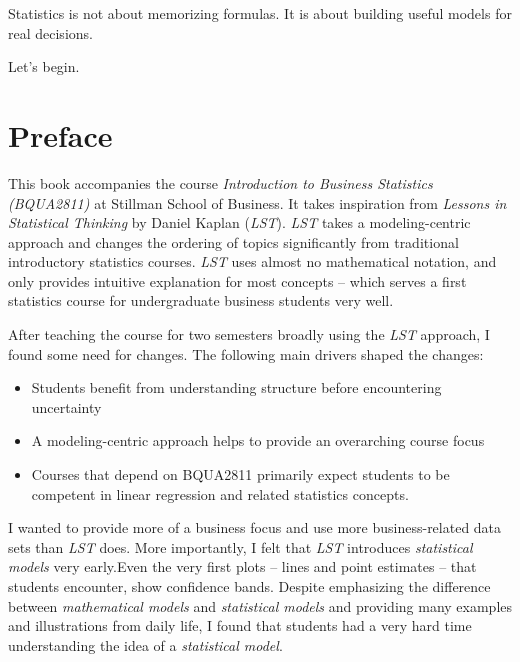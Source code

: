 \documentclass[
  12pt,
  letterpaper,
  DIV=11,
  numbers=noendperiod]{scrreprt}
\providecommand{\tightlist}{%
  \setlength{\itemsep}{0pt}\setlength{\parskip}{0pt}}
\begin{document}
Statistics is not about memorizing formulas. It is about building useful
models for real decisions.

Let's begin.


\chapter*{Preface}\label{preface}


This book accompanies the course \emph{Introduction to Business
Statistics (BQUA2811)} at Stillman School of Business. It takes
inspiration from \emph{Lessons in Statistical Thinking} by Daniel Kaplan
(\emph{LST}). \emph{LST} takes a modeling-centric approach and changes
the ordering of topics significantly from traditional introductory
statistics courses. \emph{LST} uses almost no mathematical notation, and
only provides intuitive explanation for most concepts -- which serves a
first statistics course for undergraduate business students very well.

After teaching the course for two semesters broadly using the \emph{LST}
approach, I found some need for changes. The following main drivers
shaped the changes:

\begin{itemize}
\tightlist
\item
  Students benefit from understanding structure before encountering
  uncertainty
\item
  A modeling-centric approach helps to provide an overarching course
  focus
\item
  Courses that depend on BQUA2811 primarily expect students to be
  competent in linear regression and related statistics concepts.
\end{itemize}

I wanted to provide more of a business focus and use more
business-related data sets than \emph{LST} does. More importantly, I
felt that \emph{LST} introduces \emph{statistical models} very
early.Even the very first plots -- lines and point estimates -- that
students encounter, show confidence bands. Despite emphasizing the
difference between \emph{mathematical models} and \emph{statistical
models} and providing many examples and illustrations from daily life, I
found that students had a very hard time understanding the idea of a
\emph{statistical model}.
\end{document}
